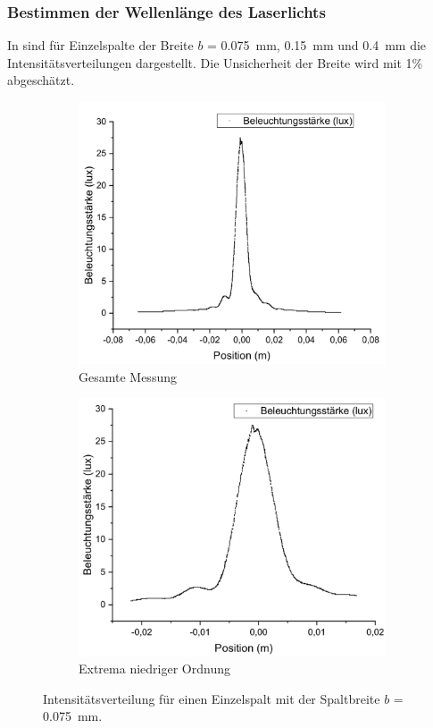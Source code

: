 \documentclass[
	a4paper,
	12pt,
	pagesize,
	ngerman
]{scrartcl}
\begin{document}
	\subsubsection{Bestimmen der Wellenlänge des Laserlichts}
	In  sind für Einzelspalte der Breite $b$ = \SI{0,075}{mm}, \SI{0,15}{mm} und \SI{0,4}{mm} die Intensitätsverteilungen dargestellt. 
	Die Unsicherheit der Breite wird mit 1\% abgeschätzt.
	
	\begin{figure}[H]
		\centering
		\begin{subfigure}{.5\textwidth}
			\centering
			\includegraphics[width=1\linewidth]{Einzelspalt0-075mm}
			\caption{Gesamte Messung}	
		\end{subfigure}%
		\begin{subfigure}{.5\textwidth}
			\centering
			\includegraphics[width=1\linewidth]{Einzelspalt0-075mmZOOM}
			\caption{Extrema niedriger Ordnung}
		\end{subfigure}
		\caption{Intensitätsverteilung für einen Einzelspalt mit der Spaltbreite $b$ = \SI{0,075}{mm}.}
		\label{Einzelspalt0-075mm}
	\end{figure}	
\end{document}

